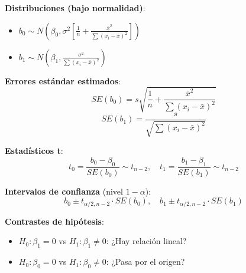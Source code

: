 \documentclass[10pt,a4paper]{article}
\begin{document}
\begin{tcolorbox}[title=Inferencia sobre los Parámetros]
    \textbf{Distribuciones (bajo normalidad)}:
    \begin{itemize}
        \item $b_0 \sim N\left(\beta_0, \sigma^2\left[\frac{1}{n} + \frac{\bar{x}^2}{\sum(x_i - \bar{x})^2}\right]\right)$
        \item $b_1 \sim N\left(\beta_1, \frac{\sigma^2}{\sum(x_i - \bar{x})^2}\right)$
    \end{itemize}
    
    \textbf{Errores estándar estimados}:
    \[
        SE(b_0) = s \sqrt{\frac{1}{n} + \frac{\bar{x}^2}{\sum(x_i - \bar{x})^2}}
    \]
    \[
        SE(b_1) = \frac{s}{\sqrt{\sum(x_i - \bar{x})^2}}
    \]
    
    \textbf{Estadísticos t}:
    \[
        t_0 = \frac{b_0 - \beta_0}{SE(b_0)} \sim t_{n-2}, \quad t_1 = \frac{b_1 - \beta_1}{SE(b_1)} \sim t_{n-2}
    \]
    
    \textbf{Intervalos de confianza} (nivel $1-\alpha$):
    \[
        b_0 \pm t_{\alpha/2, n-2} \cdot SE(b_0), \quad b_1 \pm t_{\alpha/2, n-2} \cdot SE(b_1)
    \]
    
    \textbf{Contrastes de hipótesis}:
    \begin{itemize}
        \item $H_0: \beta_1 = 0$ vs $H_1: \beta_1 \neq 0$: ¿Hay relación lineal?
        \item $H_0: \beta_0 = 0$ vs $H_1: \beta_0 \neq 0$: ¿Pasa por el origen?
    \end{itemize}
\end{tcolorbox}

\end{document}
